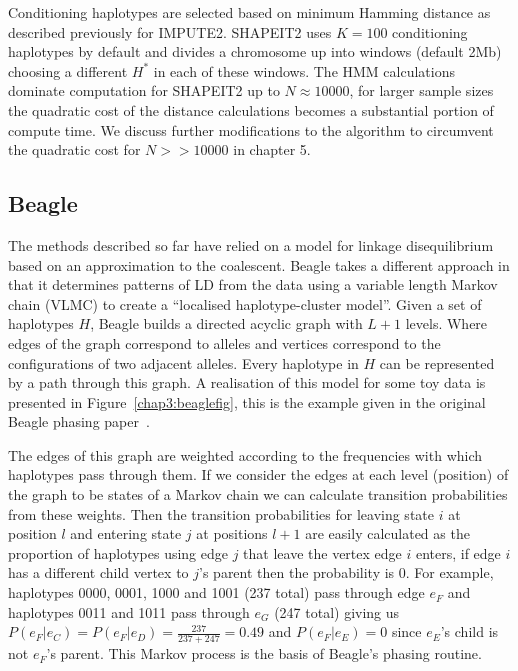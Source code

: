  Conditioning haplotypes are selected based on minimum Hamming distance as described previously for IMPUTE2.  SHAPEIT2 uses $K=100$ conditioning haplotypes by default and divides a chromosome up into windows (default 2Mb) choosing a different $H^{*}$ in each of these windows. The HMM calculations dominate computation for SHAPEIT2 up to $N\approx10000$, for larger sample sizes the quadratic cost of the distance calculations becomes a substantial portion of compute time. We discuss further modifications to the algorithm to circumvent the quadratic cost for $N>>10000$ in chapter 5. 

\subsection{Beagle}
The methods described so far have relied on a model for linkage disequilibrium based on an approximation to the coalescent.  Beagle takes a different approach in that it determines patterns of LD from the data using a variable length Markov chain (VLMC) to create a ``localised haplotype-cluster model''.  Given a set of haplotypes $H$, Beagle builds a directed acyclic graph with $L+1$ levels.  Where edges of the graph correspond to alleles and vertices correspond to the configurations of two adjacent alleles. Every haplotype in $H$ can be represented by a path through this graph.  A realisation of this model for some toy data is presented in Figure~\ref{chap3:beaglefig}, this is the example given in the original Beagle phasing paper~\citep{browning2007}.

The edges of this graph are weighted according to the frequencies with which haplotypes pass through them. If we consider the edges at each level (position) of the graph to be states of a Markov chain we can calculate transition probabilities from these weights.  Then the transition probabilities for leaving state $i$ at position $l$ and entering state $j$ at positions $l+1$  are easily calculated as the proportion of haplotypes using edge $j$ that leave the vertex edge $i$ enters, if edge $i$ has a different child vertex to $j$'s parent then the probability is 0.  For example, haplotypes 0000, 0001, 1000 and 1001 (237 total) pass through edge $e_F$ and haplotypes 0011 and 1011 pass through $e_G$ (247 total) giving us  $P(e_F|e_C) = P(e_F|e_D) = \frac{237}{237+247} = 0.49$ and $P(e_F|e_E)=0$ since $e_E$'s child is not $e_F$'s parent. This Markov process is the basis of Beagle's phasing routine.

